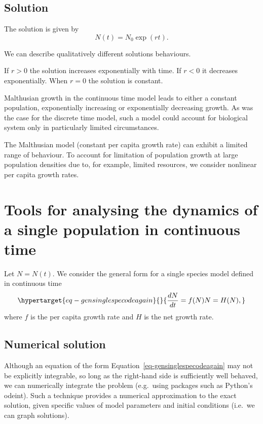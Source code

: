 \documentclass[
  letterpaper,
  DIV=11,
  numbers=noendperiod]{scrreprt}
\begin{document}
\hypertarget{solution}{%
\subsection{Solution}\label{solution}}

The solution is given by \[
N(t)=N_0\exp(rt).
\]

We can describe qualitatively different solutions behaviours.

If \(r>0\) the solution increases exponentially with time. If \(r<0\) it
decreases exponentially. When \(r=0\) the solution is constant.

Malthusian growth in the continuous time model leads to either a
constant population, exponentially increasing or exponentially
decreasing growth. As was the case for the discrete time model, such a
model could account for biological system only in particularly limited
circumstances.

The Malthusian model (constant per capita growth rate) can exhibit a
limited range of behaviour. To account for limitation of population
growth at large population densities due to, for example, limited
resources, we consider nonlinear per capita growth rates.

\hypertarget{tools-for-analysing-the-dynamics-of-a-single-population-in-continuous-time}{%
\section{Tools for analysing the dynamics of a single population in
continuous
time}\label{tools-for-analysing-the-dynamics-of-a-single-population-in-continuous-time}}

Let \(N=N(t)\). We consider the general form for a single species model
defined in continuous time
\begin{equation}\protect\hypertarget{eq-gensinglespecodeagain}{}{
\frac{dN}{dt}=f(N)N=H(N),
}\label{eq-gensinglespecodeagain}\end{equation} where \(f\) is the per
capita growth rate and \(H\) is the net growth rate.

\hypertarget{numerical-solution-2}{%
\subsection{Numerical solution}\label{numerical-solution-2}}

Although an equation of the form Equation~\ref{eq-gensinglespecodeagain}
may not be explicitly integrable, so long as the right-hand side is
sufficiently well behaved, we can numerically integrate the problem
(e.g.~using packages such as Python's odeint). Such a technique provides
a numerical approximation to the exact solution, given specific values
of model parameters and initial conditions (i.e.~we can graph
solutions).
\end{document}
